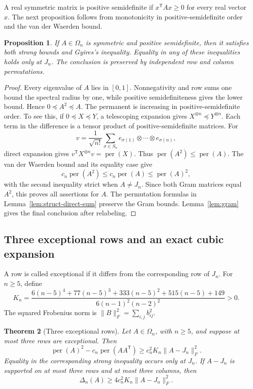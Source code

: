 \documentclass[11pt,a4paper]{article}
\newtheorem{theorem}{Theorem}[section]
\newtheorem{proposition}[theorem]{Proposition}
\theoremstyle{definition}
\theoremstyle{remark}
\newcommand{\per}{\operatorname{per}}
\newcommand{\T}{\mathsf{T}}
\begin{document}
A real symmetric matrix is positive semidefinite if $x^\T Ax\ge0$ for every real vector $x$.
The next proposition follows from monotonicity in positive-semidefinite order and the van der Waerden bound.

\begin{proposition}\label{prop:struct-psd}
If $A\in\Omega_n$ is symmetric and positive semidefinite, then it satisfies both strong bounds and Gyires's inequality.
Equality in any of these inequalities holds only at $J_n$.
The conclusion is preserved by independent row and column permutations.
\end{proposition}

\begin{proof}
Every eigenvalue of $A$ lies in $[0,1]$.
Nonnegativity and row sums one bound the spectral radius by one, while positive semidefiniteness gives the lower bound.
Hence $0\preceq A^2\preceq A$.
The permanent is increasing in positive-semidefinite order.
To see this, if $0\preceq X\preceq Y$, a telescoping expansion gives
$X^{\otimes n}\preceq Y^{\otimes n}$.
Each term in the difference is a tensor product of positive-semidefinite matrices.
For
\[
 v=\frac1{\sqrt{n!}}\sum_{\sigma\in S_n}
 e_{\sigma(1)}\otimes\cdots\otimes e_{\sigma(n)},
\]
direct expansion gives $v^\T X^{\otimes n}v=\per(X)$.
Thus $\per(A^2)\le\per(A)$.
The van der Waerden bound and its equality case give
\[
 c_n\per(A^2)\le c_n\per(A)\le\per(A)^2,
\]
with the second inequality strict when $A\ne J_n$.
Since both Gram matrices equal $A^2$, this proves all assertions for $A$.
The permutation formulas in Lemma~\ref{lem:struct-direct-sum} preserve the Gram bounds.
Lemma~\ref{lem:gram} gives the final conclusion after relabeling.
\end{proof}

\subsection{Three exceptional rows and an exact cubic expansion}

A row is called exceptional if it differs from the corresponding row of $J_n$.
For $n\ge5$, define
\begin{equation}\label{eq:struct-K}
 K_n=\frac{6(n-5)^4+77(n-5)^3+333(n-5)^2+515(n-5)+149}
 {6(n-1)^2(n-2)^2}>0.
\end{equation}
The squared Frobenius norm is $\|B\|_F^2=\sum_{i,j}b_{ij}^2$.

\begin{theorem}[Three exceptional rows]\label{thm:struct-three-row}
Let $A\in\Omega_n$, with $n\ge5$, and suppose at most three rows are exceptional.
Then
\begin{equation}\label{eq:struct-three-row}
 \per(A)^2-c_n\per(AA^\T)
 \ge c_n^2K_n\|A-J_n\|_F^2.
\end{equation}
Equality in the corresponding strong inequality occurs only at $J_n$.
If $A-J_n$ is supported on at most three rows and at most three columns, then
\begin{equation}\label{eq:struct-three-block}
 \Delta_n(A)\ge4c_n^2K_n\|A-J_n\|_F^2.
\end{equation}
\end{theorem}
\end{document}
